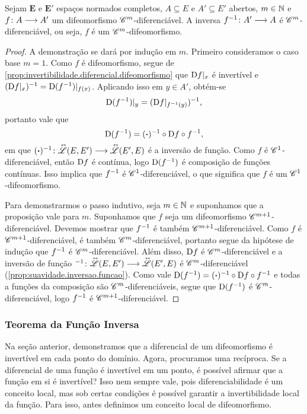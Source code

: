 \begin{proposition}
\label{prop:difeomorfismo.multidiferenciavel}
Sejam $\bm E$ e $\bm E'$ espaços normados completos, $A \subseteq E$ e $A' \subseteq E'$ abertos, $m \in \mathbb{N}$ e ${f}\colon {A} \longrightarrow {A'}$ um difeomorfismo $\mathscr{C}^m$-diferenciável. A inversa ${f^{-1}}\colon {A'} \longrightarrow {A}$ é $\mathscr{C}^m$-diferenciável, ou seja, $f$ é um $\mathscr{C}^m$-difeomorfismo.
\end{proposition}
\begin{proof}
A demonstração se dará por indução em $m$. Primeiro consideramos o caso base $m=1$. Como $f$ é difeomorfismo, segue de \ref{prop:invertibilidade.diferencial.difeomorfismo} que $\mathrm{D} f|_x$ é invertível e $(\mathrm{D} f|_{x})^{-1} = \mathrm{D} (f^{-1})|_{f(x)}$.
Aplicando isso em $y \in A'$, obtém-se
	\begin{equation*}
	\mathrm{D} (f^{-1})|_{y} = (\mathrm{D} f|_{f^{-1}(y)})^{-1},
	\end{equation*}
portanto vale que
	\begin{equation*}
	\mathrm{D} (f^{-1}) = (\bm{\cdot})^{-1} \circ \mathrm{D} f \circ f^{-1},
	\end{equation*}
em que ${(\bm{\cdot})^{-1}}\colon {\accentset{\leftrightarrow\ }{\mathscr{L}}(E,E')} \longrightarrow {\accentset{\leftrightarrow\ }{\mathscr{L}}(E',E)}$ é a inversão de função. Como $f$ é $\mathscr{C}^1$-diferenciável, então $\mathrm{D} f$ é contínua, logo $\mathrm{D} (f^{-1})$ é composição de funções contínuas. Isso implica que $f^{-1}$ é $\mathscr{C}^1$-diferenciável, o que significa que $f$ é um $\mathscr{C}^1$-difeomorfismo.

Para demonstrarmos o passo indutivo, seja $m \in \mathbb{N}$ e suponhamos que a proposição vale para $m$. Suponhamos que $f$ seja um difeomorfismo $\mathscr{C}^{m+1}$-diferenciável. Devemos mostrar que $f^{-1}$ é também $\mathscr{C}^{m+1}$-diferenciável. Como $f$ é $\mathscr{C}^{m+1}$-diferenciável, é também $\mathscr{C}^m$-diferenciável, portanto segue da hipótese de indução que $f^{-1}$ é $\mathscr{C}^m$-diferenciável. Além disso, $\mathrm{D} f$ é $\mathscr{C}^m$-diferenciável e a inversão de função ${^{-1}}\colon {\accentset{\leftrightarrow\ }{\mathscr{L}}(E,E')} \longrightarrow {\accentset{\leftrightarrow\ }{\mathscr{L}}(E',E)}$ é $\mathscr{C}^m$-diferenciável (\ref{prop:suavidade.inversao.funcao}). Como vale $\mathrm{D} (f^{-1}) = (\bm{\cdot})^{-1} \circ \mathrm{D} f \circ f^{-1}$ e todas a funções da composição são $\mathscr{C}^m$-diferenciáveis, segue que $\mathrm{D} (f^{-1})$ é $\mathscr{C}^m$-diferenciável, logo $f^{-1}$ é $\mathscr{C}^{m+1}$-diferenciável.
\end{proof}

\subsubsection{Teorema da Função Inversa}

Na seção anterior, demonstramos que a diferencial de um difeomorfismo é invertível em cada ponto do domínio. Agora, procuramos uma recíproca. Se a diferencial de uma função é invertível em um ponto, é possível afirmar que a função em si é invertível? Isso nem sempre vale, pois diferenciabilidade é um conceito local, mas sob certas condições é possível garantir a invertibilidade local da função. Para isso, antes definimos um conceito local de difeomorfismo.

